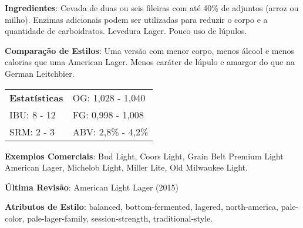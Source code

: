 \textbf{Ingredientes}: Cevada de duas ou seis fileiras com até 40\% de adjuntos (arroz ou milho). Enzimas adicionais podem ser utilizadas para reduzir o corpo e a quantidade de carboidratos. Levedura Lager. Pouco uso de lúpulos.

\textbf{Comparação de Estilos}: Uma versão com menor corpo, menos álcool e menos calorias que uma American Lager. Menos caráter de lúpulo e amargor do que na German Leitchbier.

\begin{tabular}{@{}p{35mm}p{35mm}@{}}
  \textbf{Estatísticas} & OG: 1,028 - 1,040 \\
  IBU: 8 - 12  & FG: 0,998 - 1,008 \\
  SRM: 2 - 3  & ABV: 2,8\% - 4,2\%
\end{tabular}

\textbf{Exemplos Comerciais}: Bud Light, Coors Light, Grain Belt Premium Light American Lager, Michelob Light, Miller Lite, Old Milwaukee Light.

\textbf{Última Revisão}: American Light Lager (2015)

\textbf{Atributos de Estilo}: balanced, bottom-fermented, lagered, north-america, pale-color, pale-lager-family, session-strength, traditional-style.